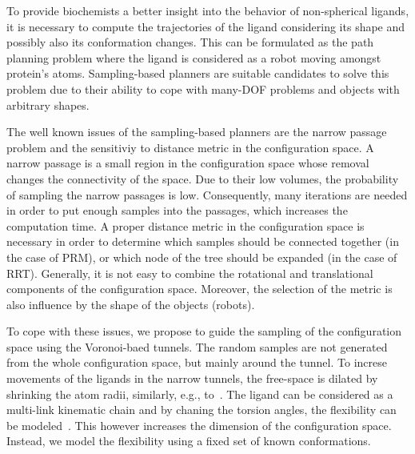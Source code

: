 \documentclass[letterpaper, 10 pt, conference]{ieeeconf} %
\begin{document}
To provide biochemists  a better insight into the behavior of non-spherical ligands, it is necessary to compute the trajectories of the ligand considering its shape and possibly also its conformation changes.
This can be formulated as the path planning problem where the ligand is considered as a robot moving amongst protein's atoms.
Sampling-based planners are suitable candidates to solve this problem due to their ability to cope with many-DOF problems and objects with arbitrary shapes.

The well known issues of the sampling-based planners are the narrow passage problem and the sensitiviy to distance metric in the configuration space.
A narrow passage is a small region in the configuration space whose removal changes the connectivity of the space.
Due to their low volumes, the probability of sampling the narrow passages is low.
Consequently, many iterations are needed in order to put enough samples into the passages, which increases the computation time.
A proper distance metric in the configuration space is necessary in order to determine which samples should be connected together (in the case of PRM), or which node of the tree should be expanded (in the case of RRT).
Generally, it is not easy to combine the rotational and translational components of the configuration space.
Moreover, the selection of the metric is also influence by the shape of the objects (robots).

To cope with these issues, we propose to guide the sampling of the configuration space using the Voronoi-baed tunnels.
The random samples are not generated from the whole configuration space, but mainly around the tunnel.
To increse movements of the ligands in the narrow tunnels, the free-space is dilated by 
shrinking the atom radii, similarly, e.g., to~\cite{cortes2005path,hsuMultiLevel}.
The ligand can be considered as a multi-link kinematic chain and by chaning the torsion angles, the flexibility can be modeled~\cite{songPFpath,cortes2005path}.
This however increases the dimension of the configuration space.
Instead, we model the flexibility using a fixed set of known conformations.

\end{document}
